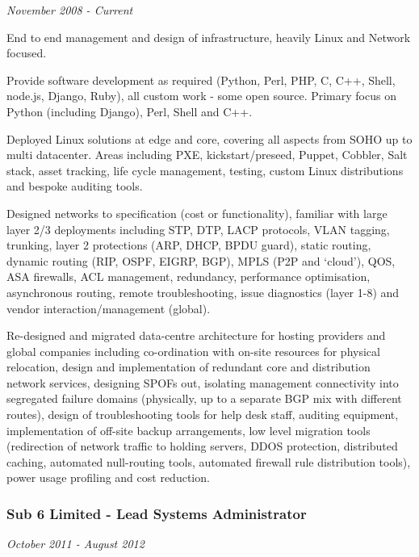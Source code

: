 \emph{November 2008 - Current}

End to end management and design of infrastructure, heavily Linux and
Network focused.

Provide software development as required (Python, Perl, PHP, C, C++,
Shell, node.js, Django, Ruby), all custom work - some open source.
Primary focus on Python (including Django), Perl, Shell and C++.

Deployed Linux solutions at edge and core, covering all aspects from
SOHO up to multi datacenter. Areas including PXE, kickstart/preseed,
Puppet, Cobbler, Salt stack, asset tracking, life cycle management,
testing, custom Linux distributions and bespoke auditing tools.

Designed networks to specification (cost or functionality), familiar
with large layer 2/3 deployments including STP, DTP, LACP protocols,
VLAN tagging, trunking, layer 2 protections (ARP, DHCP, BPDU guard),
static routing, dynamic routing (RIP, OSPF, EIGRP, BGP), MPLS (P2P and
`cloud'), QOS, ASA firewalls, ACL management, redundancy, performance
optimisation, asynchronous routing, remote troubleshooting, issue
diagnostics (layer 1-8) and vendor interaction/management (global).

Re-designed and migrated data-centre architecture for hosting providers
and global companies including co-ordination with on-site resources for
physical relocation, design and implementation of redundant core and
distribution network services, designing SPOFs out, isolating management
connectivity into segregated failure domains (physically, up to a
separate BGP mix with different routes), design of troubleshooting tools
for help desk staff, auditing equipment, implementation of off-site
backup arrangements, low level migration tools (redirection of network
traffic to holding servers, DDOS protection, distributed caching,
automated null-routing tools, automated firewall rule distribution
tools), power usage profiling and cost reduction.

\subsubsection{Sub 6 Limited - Lead Systems
Administrator}\label{sub-6-limited---lead-systems-administrator}

\emph{October 2011 - August 2012}

